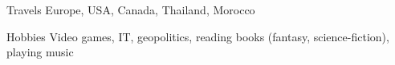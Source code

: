 
\begin{cvskills}

\cvskill
{Travels} %
{Europe, USA, Canada, Thailand, Morocco}


\cvskill
{Hobbies} %
{Video games, IT, geopolitics, reading books (fantasy, science-fiction), playing music}

\end{cvskills}
